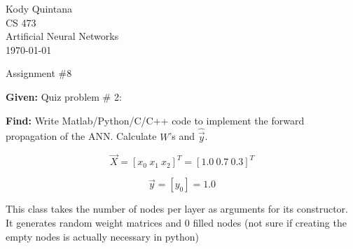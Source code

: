 \documentclass[14pt]{article}
\begin{document}
\begin{flushleft}
 
\large
Kody Quintana\\
CS 473\\
Artificial Neural Networks\\
\today\\
\boldmath

\begin{center}
Assignment \#8
\end{center}

\question
\textbf{Given:}
	Quiz problem \# 2:

\textbf{Find:}
	Write Matlab/Python/C/C++ code to implement the forward propagation of the ANN. Calculate $W$'s and $\hat{\vec{y}}$.

\[\vec{X} = [x_0 \ x_1  \ x_2]^T = [1.0 \ 0.7 \ 0.3]^T\]

\[\vec{y} = [y_0] = 1.0\]

\closequestion

This class takes the number of nodes per layer as arguments for its constructor.
It generates random weight matrices and 0 filled nodes (not sure if creating the empty nodes is actually necessary in python)
\end{flushleft}
\end{document}
